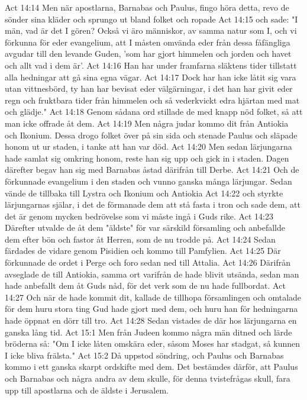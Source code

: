 Act 14:14  Men när apostlarna, Barnabas och Paulus, fingo höra detta, revo de sönder sina kläder och sprungo ut bland folket och ropade
Act 14:15  och sade: "I män, vad är det I gören? Också vi äro människor, av samma natur som I, och vi förkunna för eder evangelium, att I måsten omvända eder från dessa fåfängliga avgudar till den levande Guden, 'som har gjort himmelen och jorden och havet och allt vad i dem är'.
Act 14:16  Han har under framfarna släktens tider tillstatt alla hedningar att gå sina egna vägar.
Act 14:17  Dock har han icke låtit sig vara utan vittnesbörd, ty han har bevisat eder välgärningar, i det han har givit eder regn och fruktbara tider från himmelen och så vederkvickt edra hjärtan med mat och glädje."
Act 14:18  Genom sådana ord stillade de med knapp nöd folket, så att man icke offrade åt dem.
Act 14:19  Men några judar kommo dit från Antiokia och Ikonium. Dessa drogo folket över på sin sida och stenade Paulus och släpade honom ut ur staden, i tanke att han var död.
Act 14:20  Men sedan lärjungarna hade samlat sig omkring honom, reste han sig upp och gick in i staden. Dagen därefter begav han sig med Barnabas åstad därifrån till Derbe.
Act 14:21  Och de förkunnade evangelium i den staden och vunno ganska många lärjungar. Sedan vände de tillbaka till Lystra och Ikonium och Antiokia
Act 14:22  och styrkte lärjungarnas själar, i det de förmanade dem att stå fasta i tron och sade dem, att det är genom mycken bedrövelse som vi måste ingå i Guds rike.
Act 14:23  Därefter utvalde de åt dem "äldste" för var särskild församling och anbefallde dem efter bön och fastor åt Herren, som de nu trodde på.
Act 14:24  Sedan färdades de vidare genom Pisidien och kommo till Pamfylien.
Act 14:25  Där förkunnade de ordet i Perge och foro sedan ned till Attalia.
Act 14:26  Därifrån avseglade de till Antiokia, samma ort varifrån de hade blivit utsända, sedan man hade anbefallt dem åt Guds nåd, för det verk som de nu hade fullbordat.
Act 14:27  Och när de hade kommit dit, kallade de tillhopa församlingen och omtalade för dem huru stora ting Gud hade gjort med dem, och huru han för hedningarna hade öppnat en dörr till tro.
Act 14:28  Sedan vistades de där hos lärjungarna en ganska lång tid.
Act 15:1  Men från Judeen kommo några män ditned och lärde bröderna så: "Om I icke låten omskära eder, såsom Moses har stadgat, så kunnen I icke bliva frälsta."
Act 15:2  Då uppstod söndring, och Paulus och Barnabas kommo i ett ganska skarpt ordskifte med dem. Det bestämdes därför, att Paulus och Barnabas och några andra av dem skulle, för denna tvistefrågas skull, fara upp till apostlarna och de äldste i Jerusalem.
